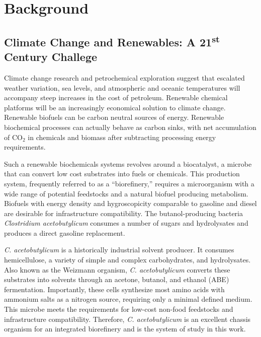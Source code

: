 
\chapter{Background}

\section{Climate Change and Renewables: A 21\textsuperscript{st} Century Challege}
Climate change research\cite{95} and petrochemical exploration\cite{120,121} suggest that escalated weather variation, sea levels, and atmospheric and oceanic temperatures will accompany steep increases in the cost of petroleum. Renewable chemical platforms will be an increasingly economical solution to climate change. Renewable biofuels can be carbon neutral sources of energy. Renewable biochemical processes can actually behave as carbon sinks, with net accumulation of CO$_{2}$ in chemicals and biomass after subtracting processing energy requirements.

Such a renewable biochemicals systems revolves around a biocatalyst, a microbe that can convert low cost substrates into fuels or chemicals.\cite{3,4,13,16,24,26} This production system, frequently referred to as a ``biorefinery,'' requires a microorganism with a wide range of potential feedstocks and a natural biofuel producing metabolism. Biofuels with energy density and hygroscopicity comparable to gasoline and diesel are desirable for infrastructure compatibility. The butanol-producing bacteria \textit{Clostridium acetobutylicum} consumes a number of sugars and hydrolysates\cite{101} and produces a direct gasoline replacement.\cite{122}

\textit{C. acetobutylicum} is a historically industrial solvent producer.\cite{123} It consumes hemicellulose, a variety of simple and complex carbohydrates, and hydrolysates.\cite{101,123} Also known as the Weizmann organism, \textit{C. acetobutylicum} converts these substrates into solvents through an acetone, butanol, and ethanol (ABE) fermentation.\cite{101,123} Importantly, these cells synthesize most amino acids with ammonium salts as a nitrogen source, requiring only a minimal defined medium.\cite{124,39} This microbe meets the requirements for low-cost non-food feedstocks and infrastructure compatibility. Therefore, \textit{C. acetobutylicum} is an excellent chassis organism for an integrated biorefinery and is the system of study in this work.

